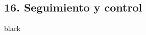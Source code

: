\documentclass[11pt]{charter}
\begin{document}
\begin{landscape}
\section{16. Seguimiento y control}
\label{sec:seguimiento}

\begin{consigna}{black}
%

\end{consigna}

%
%
%
%
%


\end{landscape}
\end{document}
